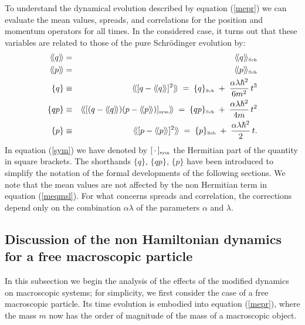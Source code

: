 \documentclass[10pt,a4paper]{article}
\newcommand{\llangle}{\langle\!\langle}
\newcommand{\rrangle}{\rangle\!\rangle}
\begin{document}
To understand the dynamical evolution described by equation
(\ref{mepr}) we can evaluate the mean values, spreads, and
correlations for the position and momentum operators for all
times. In the considered case, it turns out \cite{grw} that these
variables are related to those of the pure Schr\"odinger evolution
by:
\begin{eqnarray}
\llangle q \rrangle & = & \llangle q \rrangle_{\makebox{\tiny
Sch}} \label{pedc}\\
\llangle p \rrangle & = & \llangle p \rrangle_{\makebox{\tiny
Sch}} \label{pedc2} \\
\{ q \} & \equiv & \llangle [ q - \llangle q \rrangle ]^{2}
\rrangle \; = \; \{ q \}_{\makebox{\tiny Sch}} \; + \;
\frac{\alpha\lambda\hbar^{2}}{6m^{2}}\, t^{3}
\label{pedc3}\\
\{ qp \} & \equiv & \llangle [(q - \llangle q \rrangle) (p -
\llangle p \rrangle)]_{\makebox{\tiny sym}} \rrangle \; = \; \{ qp
\}_{\makebox{\tiny Sch}} \;
+ \; \frac{\alpha\lambda\hbar^{2}}{4m}\, t^{2} \label{sym}\\
\{ p \} & \equiv & \llangle [ p - \llangle p \rrangle ]^{2}
\rrangle \; = \; \{ p \}_{\makebox{\tiny Sch}} \; + \;
\frac{\alpha\lambda\hbar^{2}}{2}\, t. \label{sedc}
\end{eqnarray}
In equation (\ref{sym}) we have denoted by
$[\,\cdot\,]_{\makebox{\tiny sym}}$ the Hermitian part of the
quantity in square brackets. The shorthands $\{ q \}$, $\{ qp \}$,
$\{ p \}$ have been introduced to simplify the notation of the
formal developments of the following sections. We note that the
mean values are not affected by the non Hermitian term in equation
(\ref{meqmsl}). For what concerns spreads and correlation, the
corrections depend only on the combination $\alpha\lambda$ of the
parameters $\alpha$ and $\lambda$.


\subsection[non Hamiltonian dynamics of a free macroscopic
particle]{Discussion of the non Hamiltonian dynamics for a free
macroscopic particle} \label{sec53}

In this subsection we begin the analysis of the effects of the
modified dynamics on macroscopic systems; for simplicity, we first
consider the case of a free macroscopic particle. Its time
evolution is embodied into equation (\ref{mepr}), where the mass
$m$ now has the order of magnitude of the mass of a macroscopic
object.
\end{document}
